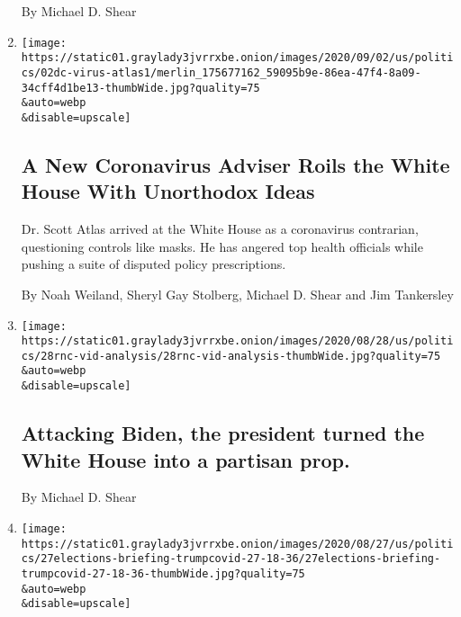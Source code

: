 \begin{enumerate}
  By Michael D. Shear
\item
  \href{/2020/09/02/us/politics/trump-scott-atlas-coronavirus.html}{}

  \texttt{[image: https://static01.graylady3jvrrxbe.onion/images/2020/09/02/us/politics/02dc-virus-atlas1/merlin\_175677162\_59095b9e-86ea-47f4-8a09-34cff4d1be13-thumbWide.jpg?quality=75\\\&auto=webp\\\&disable=upscale]}

  \hypertarget{a-new-coronavirus-adviser-roils-the-white-house-with-unorthodox-ideas}{%
  \subsection{A New Coronavirus Adviser Roils the White House With
  Unorthodox
  Ideas}\label{a-new-coronavirus-adviser-roils-the-white-house-with-unorthodox-ideas}}

  Dr. Scott Atlas arrived at the White House as a coronavirus
  contrarian, questioning controls like masks. He has angered top health
  officials while pushing a suite of disputed policy prescriptions.

  By Noah Weiland, Sheryl Gay Stolberg, Michael D. Shear and Jim
  Tankersley
\item
  \href{/2020/08/28/us/elections/attacking-biden-the-president-turned-the-white-house-into-a-partisan-prop.html}{}

  \texttt{[image: https://static01.graylady3jvrrxbe.onion/images/2020/08/28/us/politics/28rnc-vid-analysis/28rnc-vid-analysis-thumbWide.jpg?quality=75\\\&auto=webp\\\&disable=upscale]}

  \hypertarget{attacking-biden-the-president-turned-the-white-house-into-a-partisan-prop}{%
  \subsection{Attacking Biden, the president turned the White House into
  a partisan
  prop.}\label{attacking-biden-the-president-turned-the-white-house-into-a-partisan-prop}}

  By Michael D. Shear
\item
  \href{/live/2020/08/27/us/rnc-convention-election/trump-brags-about-his-handling-of-the-virus-crisis-and-says-biden-would-surrender-to-it}{}

  \texttt{[image: https://static01.graylady3jvrrxbe.onion/images/2020/08/27/us/politics/27elections-briefing-trumpcovid-27-18-36/27elections-briefing-trumpcovid-27-18-36-thumbWide.jpg?quality=75\\\&auto=webp\\\&disable=upscale]}


\end{enumerate}
